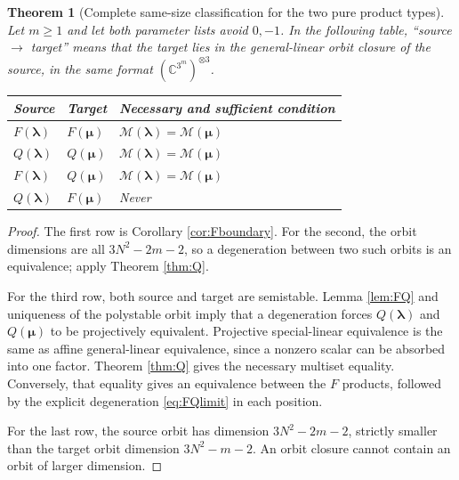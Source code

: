 \documentclass[11pt]{article}
\newtheorem{theorem}{Theorem}[section]
\theoremstyle{remark}\newtheorem{remark}[theorem]{Remark}
\newcommand{\C}{\mathbb C}
\newcommand{\mc}{\mathcal M}
\begin{document}
\begin{theorem}[Complete same-size classification for the two pure product types]\label{thm:deg}
Let $m\geq1$ and let both parameter lists avoid $0,-1$. In the following table, ``source $\to$ target'' means that the target lies in the general-linear orbit closure of the source, in the same format $(\C^{3^m})^{\otimes3}$.
\begin{center}
\begin{tabular}{lll}
\toprule
Source & Target & Necessary and sufficient condition\\
\midrule
$F(\boldsymbol\lambda)$ & $F(\boldsymbol\mu)$ & $\mc(\boldsymbol\lambda)=\mc(\boldsymbol\mu)$\\
$Q(\boldsymbol\lambda)$ & $Q(\boldsymbol\mu)$ & $\mc(\boldsymbol\lambda)=\mc(\boldsymbol\mu)$\\
$F(\boldsymbol\lambda)$ & $Q(\boldsymbol\mu)$ & $\mc(\boldsymbol\lambda)=\mc(\boldsymbol\mu)$\\
$Q(\boldsymbol\lambda)$ & $F(\boldsymbol\mu)$ & Never\\
\bottomrule
\end{tabular}
\end{center}
\end{theorem}
\begin{proof}
The first row is Corollary \ref{cor:Fboundary}. For the second, the orbit dimensions are all $3N^2-2m-2$, so a degeneration between two such orbits is an equivalence; apply Theorem \ref{thm:Q}.

For the third row, both source and target are semistable. Lemma \ref{lem:FQ} and uniqueness of the polystable orbit imply that a degeneration forces $Q(\boldsymbol\lambda)$ and $Q(\boldsymbol\mu)$ to be projectively equivalent. Projective special-linear equivalence is the same as affine general-linear equivalence, since a nonzero scalar can be absorbed into one factor. Theorem \ref{thm:Q} gives the necessary multiset equality. Conversely, that equality gives an equivalence between the $F$ products, followed by the explicit degeneration \eqref{eq:FQlimit} in each position.

For the last row, the source orbit has dimension $3N^2-2m-2$, strictly smaller than the target orbit dimension $3N^2-m-2$. An orbit closure cannot contain an orbit of larger dimension.
\end{proof}
\end{document}
